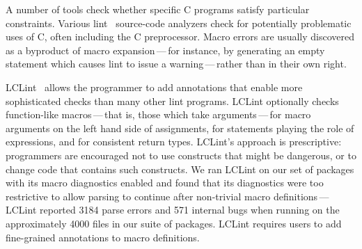 \documentclass[10pt]{article}
\begin{document}
A number of tools check whether specific C programs satisfy particular
constraints.  Various lint~\cite{Johnson77} source-code analyzers check
for potentially problematic uses of C, often including the C preprocessor.
Macro errors are usually discovered as a byproduct of macro
expansion\,---\,for instance, by generating an empty statement which causes
lint to issue a warning\,---\,rather than in their own right.

LCLint~\cite{Evans-fse94,Evans:LCLint} allows the programmer to add
annotations that enable more sophisticated checks than many other lint
programs.  LCLint optionally checks function-like macros\,---\,that is,
those which take arguments\,---\,for macro arguments on the left hand
side of assignments, for statements playing the role of expressions, and
for consistent return types.  LCLint's approach is prescriptive:
programmers are encouraged not to use constructs that might be
dangerous, or to change code that contains such constructs.  We ran
LCLint on our set of packages with its macro diagnostics enabled and
found that its diagnostics were too restrictive to allow parsing to
continue after non-trivial macro definitions\,---\,LCLint reported 3184
parse errors and 571 internal bugs when running on the approximately
4000 files in our suite of packages.  LCLint requires users to add
fine-grained annotations to macro definitions.

\end{document}
